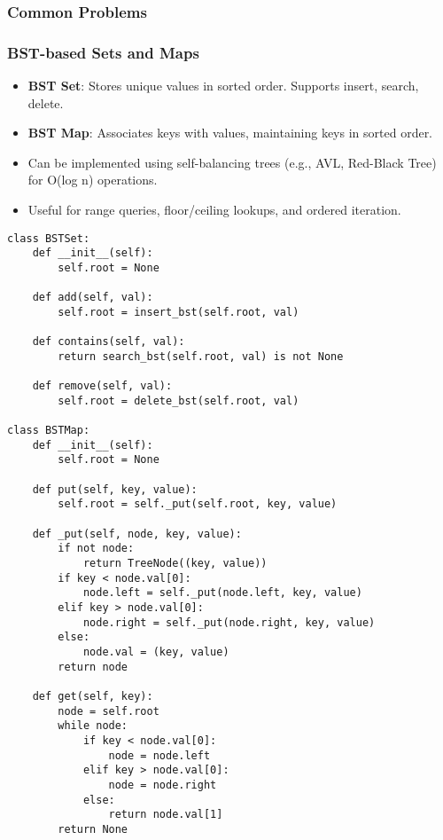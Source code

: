 \newpage

\subsubsection{Common Problems}

\begin{summary}
\end{summary}

\newpage

\subsubsection{BST-based Sets and Maps}

\begin{summary}
    \begin{itemize}
        \item \textbf{BST Set}: Stores unique values in sorted order. Supports insert, search, delete.
        \item \textbf{BST Map}: Associates keys with values, maintaining keys in sorted order.
        \item Can be implemented using self-balancing trees (e.g., AVL, Red-Black Tree) for O(log n) operations.
        \item Useful for range queries, floor/ceiling lookups, and ordered iteration.
    \end{itemize}
\end{summary}

\begin{algo}
\begin{lstlisting}
class BSTSet:
    def __init__(self):
        self.root = None

    def add(self, val):
        self.root = insert_bst(self.root, val)

    def contains(self, val):
        return search_bst(self.root, val) is not None

    def remove(self, val):
        self.root = delete_bst(self.root, val)

class BSTMap:
    def __init__(self):
        self.root = None

    def put(self, key, value):
        self.root = self._put(self.root, key, value)

    def _put(self, node, key, value):
        if not node:
            return TreeNode((key, value))
        if key < node.val[0]:
            node.left = self._put(node.left, key, value)
        elif key > node.val[0]:
            node.right = self._put(node.right, key, value)
        else:
            node.val = (key, value)
        return node

    def get(self, key):
        node = self.root
        while node:
            if key < node.val[0]:
                node = node.left
            elif key > node.val[0]:
                node = node.right
            else:
                return node.val[1]
        return None
\end{lstlisting}
\end{algo}

